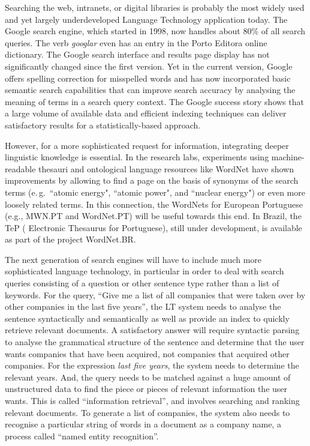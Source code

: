 \begin{multicols}{2}
  Searching the web, intranets, or digital libraries is probably the most widely used and yet largely underdeveloped Language Technology application today. The Google search engine, which started in 1998, now handles about 80\% of all search queries\cite{spi1}. The verb \textit{googlar} even has an entry in the Porto E\-di\-to\-ra online dictionary. The Google search interface and results page display has not significantly changed since the first version. Yet in the current version, Google offers spelling correction for misspelled words and  has now incorporated basic semantic search capabilities that can improve search accuracy by analysing the meaning of terms in a search query context\cite{pc1}. The Google success story shows that a large volume of available data and efficient indexing techniques can deliver satisfactory results for a statistically-based approach.   


 However, for a more sophisticated request for information, integrating deeper linguistic knowledge is essential. In the research labs, experiments using machine-readable thesauri and ontological language resources like WordNet have shown improvements by allowing to find a page on the basis of synonyms of the search terms (e.\,g.~“atomic energy", “atomic power", and “nuclear energy") or even more loosely related terms. In this connection, the WordNets for European Portuguese (e.g., MWN.PT and WordNet.PT) will be useful towards this end. In Brazil, the TeP ( Electronic Thesaurus for Portuguese), still under development, is available as part of the project WordNet.BR.

The next generation of search engines will have to include much more sophisticated language technology, in particular in order to deal with search queries consisting of a question or other sentence type rather than a list of keywords. For the query, “Give me a list of all companies that were taken over by other companies in the last five years”, the LT system needs to analyse the sentence syntactically and semantically as well as provide an index to quickly retrieve relevant documents. A satisfactory answer will require syntactic parsing to analyse the grammatical structure of the sentence and determine that the user wants companies that have been acquired, not companies that acquired other companies. For the expression \textit{last five years}, the system needs to determine the relevant years. And, the query needs to be matched against a huge amount of unstructured data to find the piece or pieces of relevant information the user wants. This is called “information retrieval”, and involves searching and ranking relevant documents. To generate a list of companies, the system also needs to recognise a particular string of words in a document as a company name, a process called “named entity recognition”.


\end{multicols}
